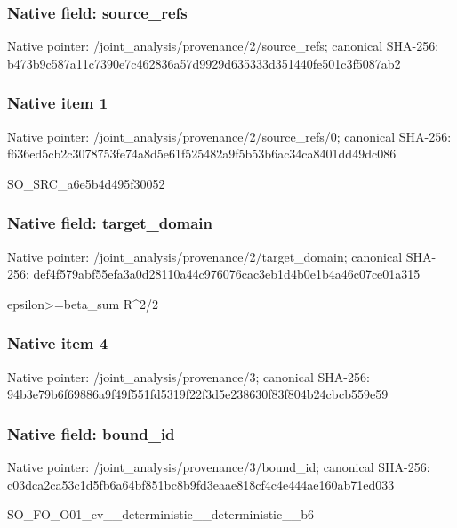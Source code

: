 \documentclass[10pt,a4paper]{article}
\begin{document}
\subsubsection{Native field: source\_\allowbreak{}refs}
Native pointer: /joint\_\allowbreak{}analysis/provenance/2/source\_\allowbreak{}refs; canonical SHA-256: b473b9c587a11c7390e7c462836a57d9929d635333d351440fe501c3f5087ab2

\subsubsection{Native item 1}
Native pointer: /joint\_\allowbreak{}analysis/provenance/2/source\_\allowbreak{}refs/0; canonical SHA-256: f636ed5cb2c3078753fe74a8d5e61f525482a9f5b53b6ac34ca8401dd49dc086

\begingroup\raggedright\sloppy SO\_\allowbreak{}SRC\_\allowbreak{}a6e5b4d495f30052\par\endgroup

\subsubsection{Native field: target\_\allowbreak{}domain}
Native pointer: /joint\_\allowbreak{}analysis/provenance/2/target\_\allowbreak{}domain; canonical SHA-256: def4f579abf55efa3a0d28110a44c976076cac3eb1d4b0e1b4a46c07ce01a315

\begingroup\raggedright\sloppy epsilon>=\allowbreak{}beta\_\allowbreak{}sum R\textasciicircum{}2/\allowbreak{}2\par\endgroup

\subsubsection{Native item 4}
Native pointer: /joint\_\allowbreak{}analysis/provenance/3; canonical SHA-256: 94b3e79b6f69886a9f49f551fd5319f22f3d5e238630f83f804b24cbcb559e59

\subsubsection{Native field: bound\_\allowbreak{}id}
Native pointer: /joint\_\allowbreak{}analysis/provenance/3/bound\_\allowbreak{}id; canonical SHA-256: c03dca2ca53c1d5fb6a64bf851bc8b9fd3eaae818cf4c4e444ae160ab71ed033

\begingroup\raggedright\sloppy SO\_\allowbreak{}FO\_\allowbreak{}O01\_\allowbreak{}cv\_\allowbreak{}\_\allowbreak{}deterministic\_\allowbreak{}\_\allowbreak{}deterministic\_\allowbreak{}\_\allowbreak{}b6\par\endgroup
\end{document}
